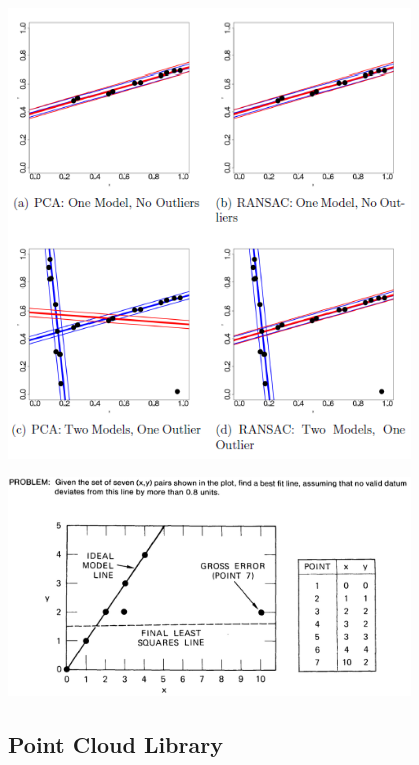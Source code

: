 \begin{center}
	\includegraphics[width=0.80\textwidth]{figures/least_squares_vs_ransac.png}
	\label{fig:ransac_vs_lsq}
\end{center}



\begin{center}
	\includegraphics[width=0.80\textwidth]{figures/least_squares_shortcomings.png}
	\label{fig:ransac}
\end{center}


\subsection[PCL]{Point Cloud Library}

